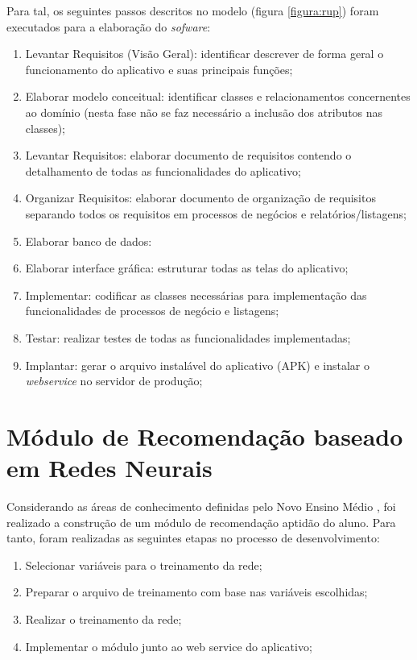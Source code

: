 Para tal, os seguintes passos descritos no modelo (figura \ref{figura:rup}) foram executados para a elaboração do \textit{sofware}:

\begin{enumerate}
   \item Levantar Requisitos (Visão Geral): identificar descrever de forma geral o funcionamento do aplicativo e suas principais funções;
   \item Elaborar modelo conceitual: identificar classes e relacionamentos concernentes ao domínio (nesta fase não se faz necessário a inclusão dos atributos nas classes);
   \item Levantar Requisitos: elaborar documento de requisitos contendo o detalhamento de todas as funcionalidades do aplicativo;
   \item Organizar Requisitos: elaborar documento de organização de requisitos separando todos os requisitos em processos de negócios e relatórios/listagens;
   \item Elaborar banco de dados: 
   \item Elaborar interface gráfica: estruturar todas as telas do aplicativo;
   \item Implementar: codificar as classes necessárias para implementação das funcionalidades de processos de negócio e listagens;
   \item Testar: realizar testes de todas as funcionalidades implementadas;
   \item Implantar: gerar o arquivo instalável do aplicativo (APK) e instalar o \textit{webservice} no servidor de produção;
\end{enumerate}

\section{Módulo de Recomendação baseado em Redes Neurais}

Considerando as áreas de conhecimento definidas pelo Novo Ensino Médio \cite{lei13415}, foi realizado a construção de um módulo de recomendação aptidão do aluno. Para tanto, foram realizadas as seguintes etapas no processo de desenvolvimento:

\begin{enumerate}
   \item Selecionar variáveis para o treinamento da rede;
   \item Preparar o arquivo de treinamento com base nas variáveis escolhidas;
   \item Realizar o treinamento da rede;
   \item Implementar o módulo junto ao web service do aplicativo;
\end{enumerate}

